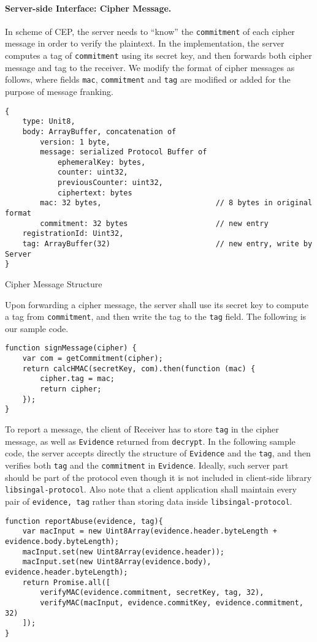 \documentclass{article}
\begin{document}
\paragraph{Server-side Interface: Cipher Message.}
In scheme of CEP, the server needs to ``know'' 
the {\tt commitment} of each cipher message
in order to verify the plaintext.
In the implementation, 
the server computes a tag of {\tt commitment} using its secret key,
and then forwards both cipher message and tag to the receiver.
We modify the format of cipher messages as follows,
where fields {\tt mac}, {\tt commitment} and {\tt tag}
are modified or added for the purpose of message franking.
\begin{table}[h]
{\small
\begin{verbatim}
{
    type: Unit8, 
    body: ArrayBuffer, concatenation of
        version: 1 byte,
        message: serialized Protocol Buffer of
            ephemeralKey: bytes,
            counter: uint32, 
            previousCounter: uint32, 
            ciphertext: bytes
        mac: 32 bytes,                          // 8 bytes in original format
        commitment: 32 bytes                    // new entry
    registrationId: Uint32, 
    tag: ArrayBuffer(32)                        // new entry, write by Server
}
\end{verbatim}
}
\caption{Cipher Message Structure}
\label{tbl:cipher-message}
\end{table}
Upon forwarding a cipher message,
the server shall use its secret key to compute a tag from {\tt commitment},
and then write the tag to the {\tt tag} field.
The following is our sample code.
{\small
\begin{verbatim}
function signMessage(cipher) {
    var com = getCommitment(cipher);
    return calcHMAC(secretKey, com).then(function (mac) {
        cipher.tag = mac;
        return cipher;
    });
}
\end{verbatim}
}
To report a message,
the client of Receiver has to store {\tt tag} in the cipher message,
as well as {\tt Evidence} returned from {\tt decrypt}.
In the following sample code, 
the server accepts directly the structure of {\tt Evidence} and the {\tt tag},
and then verifies both {\tt tag} and the {\tt commitment} in {\tt Evidence}.
Ideally, such server part should be part of the protocol
even though it is not included in client-side library {\tt libsingal-protocol}.
Also note that a client application shall maintain every pair of 
{\tt evidence, tag} rather than storing data inside {\tt libsingal-protocol}. 
{\small
\begin{verbatim}
function reportAbuse(evidence, tag){
    var macInput = new Uint8Array(evidence.header.byteLength + evidence.body.byteLength);
    macInput.set(new Uint8Array(evidence.header));
    macInput.set(new Uint8Array(evidence.body), evidence.header.byteLength);
    return Promise.all([
        verifyMAC(evidence.commitment, secretKey, tag, 32),
        verifyMAC(macInput, evidence.commitKey, evidence.commitment, 32)
    ]);
}
\end{verbatim}
}
\end{document}
